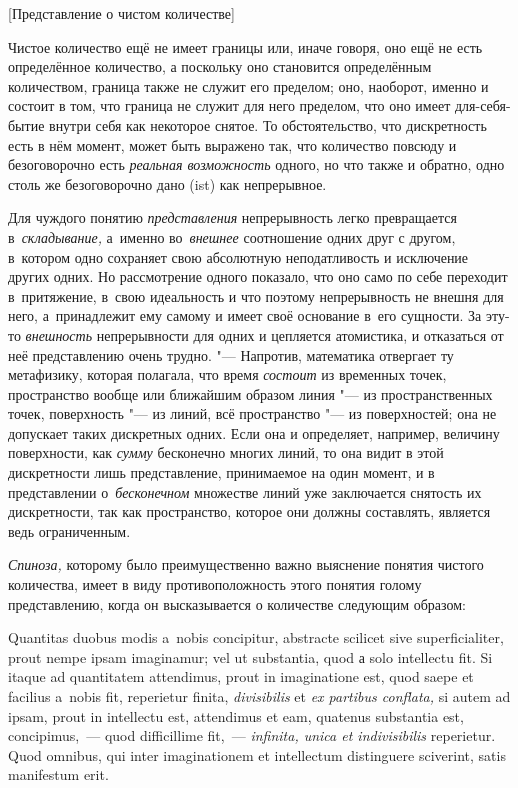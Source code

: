 %
{[Представление о чистом количестве]}

Чистое количество ещё не имеет границы или, иначе говоря, оно ещё не есть
определённое количество, а поскольку оно становится определённым
количеством, граница также не служит его пределом; оно, наоборот, именно и
состоит в том, что граница не служит для него пределом, что оно имеет
для-себя-бытие внутри себя как некоторое снятое. То обстоятельство, что
дискретность есть в нём момент, может быть выражено так, что количество
повсюду и безоговорочно есть {\em реальная возможность} одного, но
что также и обратно, одно столь же безоговорочно дано (ist) как непрерывное.

Для чуждого понятию {\em представления} непрерывность легко превращается
в~{\em складывание,} а~именно во~{\em внешнее} соотношение одних друг с другом,
в~котором одно сохраняет свою абсолютную неподатливость и исключение других
одних. Но рассмотрение одного показало, что оно само по себе переходит
в~притяжение, в~свою идеальность и что поэтому непрерывность не внешня для
него, а~принадлежит ему самому и имеет своё основание в~его сущности. За эту-то
{\em внешность} непрерывности для одних и цепляется атомистика, и отказаться от
неё представлению очень трудно. "--- Напротив, математика отвергает ту
метафизику, которая полагала, что время {\em состоит} из временных точек,
пространство вообще или ближайшим образом линия "--- из пространственных точек,
поверхность "--- из линий, всё пространство "--- из поверхностей; она не
допускает таких дискретных одних. Если она и определяет, например, величину
поверхности, как {\em сумму} бесконечно многих линий, то она видит в этой
дискретности лишь представление, принимаемое на один момент, и в представлении
о~{\em бесконечном} множестве линий уже заключается снятость их дискретности,
так как пространство, которое они должны составлять, является ведь
ограниченным.

{\em Спиноза,} которому было преимущественно важно выяснение понятия чистого
количества, имеет в виду противоположность этого понятия голому представлению,
когда он высказывается о количестве следующим образом:

\vspace{3mm}

\begin{footnotesize}\fontsize{10}{13}\selectfont
Quantitas duobus modis a~nobis conci\-pitur, abs\-trac\-te scili\-cet
sive super\-fi\-ci\-ali\-ter, prout nempe ipsam ima\-gina\-mur; vel ut
sub\-stan\-tia, quod а solo intel\-lectu fit. Si itaque ad quanti\-tatem
atten\-di\-mus, prout in imagin\-ati\-one est, quod saepe et faci\-lius
a~nobis fit, repe\-rietur finita, {\em divi\-sibi\-lis} et
{\em ex parti\-bus con\-flata,} si autem ad ipsam, prout in intel\-lectu est,
atten\-di\-mus et eam, quate\-nus sub\-stan\-tia est, con\-cipi\-mus,~--- quod
dif\-ficil\-lime fit,~--- {\em infi\-nita, unica et indi\-vi\-si\-bi\-lis}
re\-pe\-rietur. Quod omni\-bus, qui inter ima\-gi\-na\-tio\-nem et
intel\-lectum dis\-tin\-guere scive\-rint, satis mani\-fes\-tum erit.\par
\end{footnotesize}

